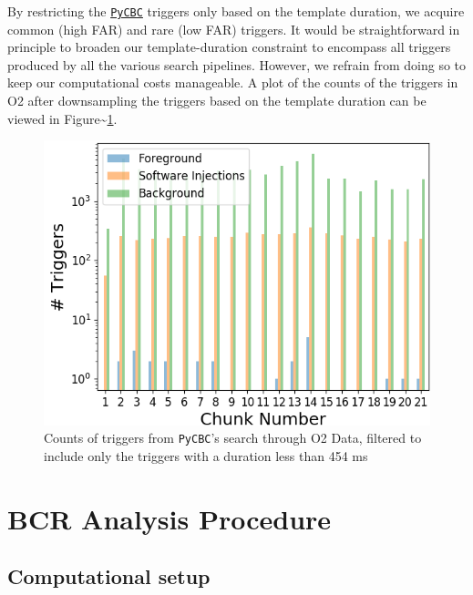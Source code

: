 \documentclass[%
 reprint,
 amsmath,amssymb,
 aps,
]{revtex4}
\begin{document}
By restricting the \href{https://pycbc.org/}{\texttt{PyCBC}} triggers only based on the template duration, we acquire common (high FAR) and rare (low
FAR) triggers. It would be straightforward in principle to broaden our template-duration constraint to encompass all
triggers produced by all the various search pipelines. However, we refrain from doing so to keep our computational costs
manageable. A plot of the counts of the triggers in O2 after downsampling the triggers based on the template duration
can be viewed in Figure\textasciitilde\ref{fig:o2FilteredTrigCount}.



\begin{figure}[!h]

{\centering \includegraphics[width=0.75\linewidth]{images/O2_filtered_trigger_counts} 

}

\caption[Count of triggers in PyCBC O2 search shorter than 454 ms]{Counts of triggers from \texttt{PyCBC}'s search through O2 Data, filtered to include only the triggers with a duration less than 454 ms}\label{fig:o2FilteredTrigCount}
\end{figure}

\hypertarget{bcr-analysis-procedure}{%
\section{BCR Analysis Procedure}\label{bcr-analysis-procedure}}

\hypertarget{computational-setup}{%
\subsection{Computational setup}\label{computational-setup}}
\end{document}
